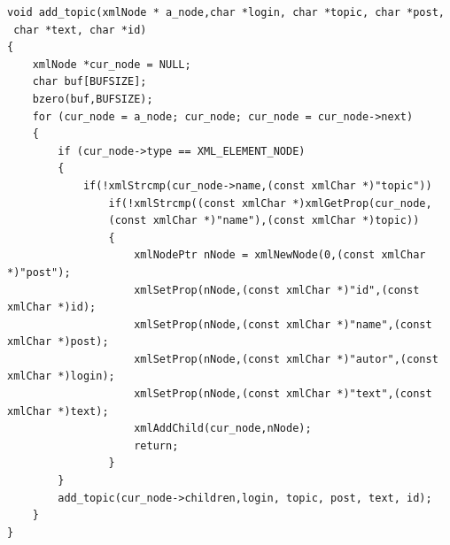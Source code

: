 \documentclass[10pt,a4paper]{report}
\begin{document}
\begin{verbatim}
void add_topic(xmlNode * a_node,char *login, char *topic, char *post,
 char *text, char *id)
{
	xmlNode *cur_node = NULL;
	char buf[BUFSIZE];
	bzero(buf,BUFSIZE);
	for (cur_node = a_node; cur_node; cur_node = cur_node->next)
	{
		if (cur_node->type == XML_ELEMENT_NODE)
		{
			if(!xmlStrcmp(cur_node->name,(const xmlChar *)"topic"))
				if(!xmlStrcmp((const xmlChar *)xmlGetProp(cur_node,
				(const xmlChar *)"name"),(const xmlChar *)topic))
				{
					xmlNodePtr nNode = xmlNewNode(0,(const xmlChar *)"post");
					xmlSetProp(nNode,(const xmlChar *)"id",(const xmlChar *)id);
					xmlSetProp(nNode,(const xmlChar *)"name",(const xmlChar *)post);
					xmlSetProp(nNode,(const xmlChar *)"autor",(const xmlChar *)login);
					xmlSetProp(nNode,(const xmlChar *)"text",(const xmlChar *)text);
					xmlAddChild(cur_node,nNode);
					return;
				}
		}
		add_topic(cur_node->children,login, topic, post, text, id);
	}
}

\end{verbatim}
\end{document}
